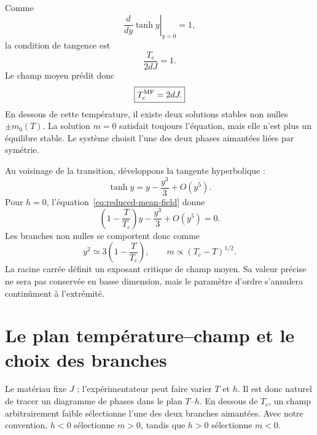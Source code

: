 Comme
\begin{equation}
\left.\frac{d}{dy}\tanh y\right|_{y=0}=1,
\end{equation}
la condition de tangence est
\begin{equation}
\frac{T_c}{2dJ}=1.
\end{equation}
Le champ moyen prédit donc
\begin{equation}
\boxed{T_c^{\rm MF}=2dJ.}
\label{eq:sm10-mean-field-tc}
\end{equation}
En dessous de cette température, il existe deux solutions stables non nulles \(\pm m_0(T)\). La solution \(m=0\) satisfait toujours l’équation, mais elle n’est plus un équilibre stable. Le système choisit l’une des deux phases aimantées liées par symétrie.

\begin{classroomqa}
\end{classroomqa}

Au voisinage de la transition, développons la tangente hyperbolique :
\begin{equation}
\tanh y=y-\frac{y^3}{3}+O(y^5).
\end{equation}
Pour \(h=0\), l’équation~\eqref{eq:reduced-mean-field} donne
\begin{equation}
\left(1-\frac{T}{T_c}\right)y-\frac{y^3}{3}+O(y^5)=0.
\end{equation}
Les branches non nulles se comportent donc comme
\begin{equation}
y^2\simeq3\left(1-\frac{T}{T_c}\right),
\qquad
m\propto(T_c-T)^{1/2}.
\label{eq:mf-beta-exponent}
\end{equation}
La racine carrée définit un exposant critique de champ moyen. Sa valeur précise ne sera pas conservée en basse dimension, mais le paramètre d’ordre s’annulera continûment à l’extrémité.

\section{Le plan température--champ et le choix des branches}

Le matériau fixe \(J\) ; l’expérimentateur peut faire varier \(T\) et \(h\). Il est donc naturel de tracer un diagramme de phases dans le plan \(T\)--\(h\). En dessous de \(T_c\), un champ arbitrairement faible sélectionne l’une des deux branches aimantées. Avec notre convention, \(h<0\) sélectionne \(m>0\), tandis que \(h>0\) sélectionne \(m<0\).

